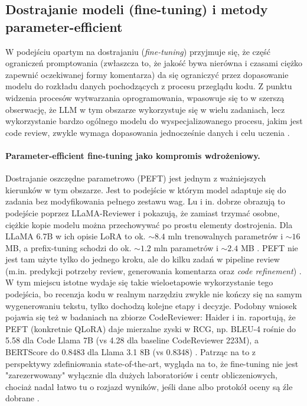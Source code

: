 \subsection{Dostrajanie modeli (fine-tuning) i metody parameter-efficient}
\label{subsec:llm_acr_finetuning}

W podejściu opartym na dostrajaniu (\emph{fine-tuning}) przyjmuje się, że część ograniczeń promptowania 
(zwłaszcza to, że jakość bywa nierówna i czasami ciężko zapewnić oczekiwanej formy komentarza) da się ograniczyć
przez dopasowanie modelu do rozkładu danych pochodzących z procesu przeglądu kodu. Z punktu widzenia procesów
wytwarzania oprogramowania, wpasowuje się to w szerszą obserwację, że LLM w tym obszarze wykorzystuje się w wielu
zadaniach, lecz wykorzystanie bardzo ogólnego modelu do wyspecjalizowanego procesu, jakim jest code review,
zwykle wymaga dopasowania jednocześnie danych i celu uczenia \cite{Zhang2024SurveyLLMSE}.

\paragraph{Parameter-efficient fine-tuning jako kompromis wdrożeniowy.}
Dostrajanie oszczędne parametrowo (PEFT) jest jednym z ważniejszych kierunków w tym obszarze. Jest to podejście
w którym model adaptuje się do zadania bez modyfikowania pełnego zestawu wag. Lu i in. dobrze obrazują to podejście
poprzez LLaMA-Reviewer i pokazują, że zamiast trzymać osobne, ciężkie kopie modelu można przechowywać po prostu elementy dostrojenia.
Dla LLaMA 6.7B w ich opisie LoRA to ok. \(\sim 8.4\) mln trenowalnych parametrów i \(\sim 16\) MB, 
a prefix-tuning schodzi do ok. \(\sim 1.2\) mln parametrów i \(\sim 2.4\) MB \cite{Lu2023LLaMAReviewer}. PEFT nie jest
tam użyte tylko do jednego kroku, ale do kilku zadań w pipeline review (m.in. predykcji potrzeby review, 
generowania komentarza oraz \emph{code refinement}) \cite{Lu2023LLaMAReviewer}.
W tym miejscu istotne wydaje się takie wieloetapowie wykorzystanie tego podejścia, bo recenzja kodu w realnym narzędziu
zwykle nie kończy się na samym wygenerowaniu tekstu, tylko dochodzą kolejne etapy i decyzje. Podobny wniosek pojawia się
też w badaniach na zbiorze CodeReviewer: Haider i in. raportują, że PEFT (konkretnie QLoRA) daje mierzalne zyski w RCG, np. BLEU-4 rośnie do 5.58 
dla Code Llama 7B (vs 4.28 dla baseline CodeReviewer 223M), a BERTScore 
do 0.8483 dla Llama 3.1 8B (vs 0.8348) \cite{Haider2024PromptingFineTuningRCG}. Patrząc na to 
z perspektywy zdefiniowania state-of-the-art, wygląda na to, że fine-tuning nie jest "zarezerwowany" wyłącznie 
dla dużych laboratoriów i centr obliczeniowych, chociaż nadal łatwo tu o rozjazd wyników, jeśli dane 
albo protokół oceny są źle dobrane \cite{Tufano2024CodeReviewAutomation}.

